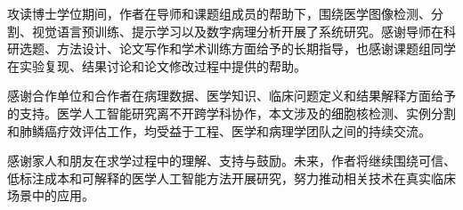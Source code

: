 \acknowledgments

攻读博士学位期间，作者在导师和课题组成员的帮助下，围绕医学图像检测、分割、视觉语言预训练、提示学习以及数字病理分析开展了系统研究。感谢导师在科研选题、方法设计、论文写作和学术训练方面给予的长期指导，也感谢课题组同学在实验复现、结果讨论和论文修改过程中提供的帮助。

感谢合作单位和合作者在病理数据、医学知识、临床问题定义和结果解释方面给予的支持。医学人工智能研究离不开跨学科协作，本文涉及的细胞核检测、实例分割和肺鳞癌疗效评估工作，均受益于工程、医学和病理学团队之间的持续交流。

感谢家人和朋友在求学过程中的理解、支持与鼓励。未来，作者将继续围绕可信、低标注成本和可解释的医学人工智能方法开展研究，努力推动相关技术在真实临床场景中的应用。
